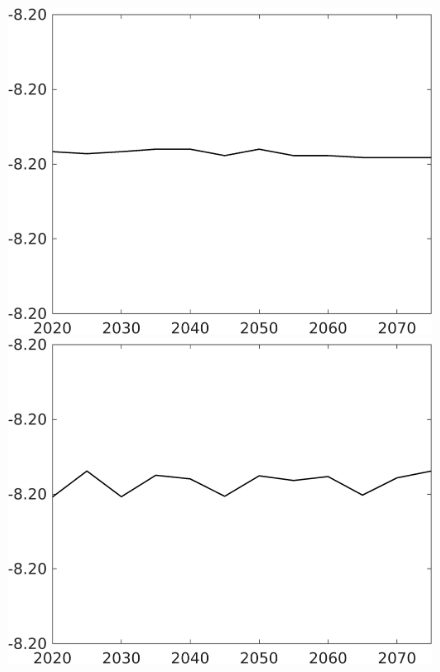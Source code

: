 \documentclass[12pt]{article}
\begin{document}
\begin{figure}[h!!]
\begin{minipage}[]{0.32\textwidth}
		\includegraphics[width=1\textwidth]{../../codding_model/own_basedOnFried/optimalPol_010922_revision/figures/all_13Sept22/CompTaul_Equlab_LFBAUPer_Reg0_hh_spillover0_nsk1_xgr1_knspil1_sep1_countec0_GovRev0_etaa0.79.png}
	\end{minipage}	
	\begin{minipage}[]{0.32\textwidth}
		\includegraphics[width=1\textwidth]{../../codding_model/own_basedOnFried/optimalPol_010922_revision/figures/all_13Sept22/CompTaul_Equlab_LFBAUPer_Reg0_C_spillover0_nsk1_xgr1_knspil1_sep1_countec0_GovRev0_etaa0.79.png}
	\end{minipage}	

\end{figure}
\end{document}

